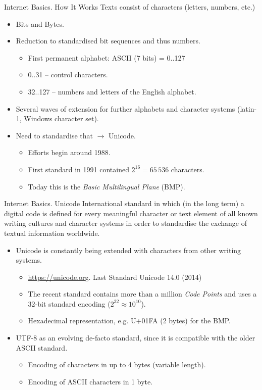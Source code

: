 \documentclass{beamer}
\begin{document}
\begin{frame}{Internet Basics. How It Works}
Texts consist of characters (letters, numbers, etc.)
\begin{itemize}
\item Bits and Bytes.
\item Reduction to standardised bit sequences and thus numbers.
  \begin{itemize}
  \item First permanent alphabet: ASCII (7 bits) = 0..127
  \item 0..31 -- control characters.
  \item 32..127 -- numbers and letters of the English alphabet.
  \end{itemize}
\item Several waves of extension for further alphabets and character systems
  (latin-1, Windows character set).
\item Need to standardise that $\to$ Unicode.
  \begin{itemize}
  \item Efforts begin around 1988.
  \item First standard in 1991 contained $2^{16} = 65\,536$ characters.
  \item Today this is the \emph{Basic Multilingual Plane} (BMP). 
  \end{itemize}
\end{itemize}
\end{frame}
\begin{frame}{Internet Basics. Unicode} 
International standard in which (in the long term) a digital code is defined
for every meaningful character or text element of all known writing cultures
and character systems in order to standardise the exchange of textual
information worldwide.

\begin{itemize}
\item Unicode is constantly being extended with characters from other writing
  systems.
  \begin{itemize}
  \item \url{https://unicode.org}. Last Standard Unicode 14.0 (2014) 
  \item The recent standard contains more than a million \emph{Code Points}
    and uses a 32-bit standard encoding ($2^{32}\approx 10^{10}$).
  \item Hexadecimal representation, e.g. U+01FA (2 bytes) for the BMP.
  \end{itemize}
\item UTF-8 as an evolving de-facto standard, since it is compatible with the
  older ASCII standard.
  \begin{itemize}
  \item Encoding of characters in up to 4 bytes (variable length).
  \item Encoding of ASCII characters in 1 byte.
  \end{itemize}
\end{itemize}
\end{frame}
\end{document}

